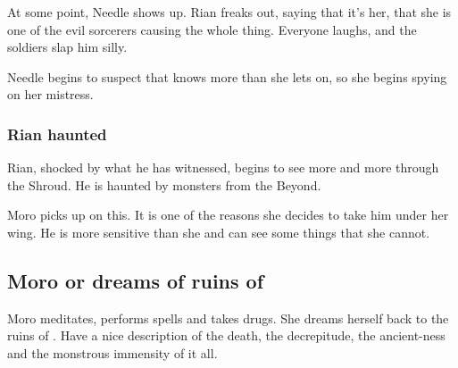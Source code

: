 \begin{garbage}
At some point, Needle shows up. Rian freaks out, saying that it's her, that she is one of the evil sorcerers causing the whole thing. Everyone laughs, and the soldiers slap him silly. 

Needle begins to suspect that \Tiroco{} knows more than she lets on, so she begins spying on her mistress. 





\subsubsection{Rian haunted}
Rian, shocked by what he has witnessed, begins to see more and more through the Shroud. 
He is haunted by monsters from the Beyond. 

Moro picks up on this. 
It is one of the reasons she decides to take him under her wing. 
He is more sensitive than she and can see some things that she cannot. 










\subsection{Moro or \Tiroco{} dreams of ruins of \Nithd}
Moro \Cornel{} meditates, performs spells and takes drugs. She dreams herself back to the ruins of \Nithd{}. Have a nice description of the death, the decrepitude, the ancient-ness and the monstrous immensity of it all. 


\end{garbage}
